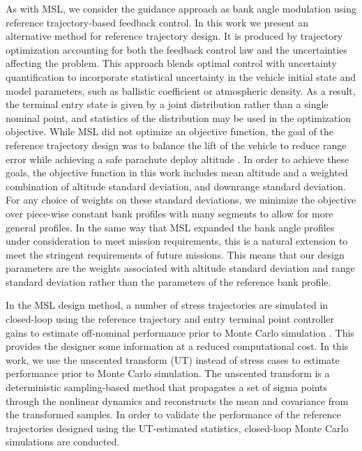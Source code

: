 \documentclass[journal ]{new-aiaa}
\begin{document}
As with MSL, we consider the guidance approach as bank angle modulation using reference trajectory-based feedback control. In this work we present an alternative method for reference trajectory design. It is produced by trajectory optimization accounting for both the feedback control law and the uncertainties affecting the problem. This approach blends optimal control with uncertainty quantification to incorporate statistical uncertainty in the vehicle initial state and model parameters, such as ballistic coefficient or atmospheric density. As a result, the terminal entry state is given by a joint distribution rather than a single nominal point, and statistics of the distribution may be used in the optimization objective. While MSL did not optimize an objective function, the goal of the reference trajectory design was to balance the lift of the vehicle to reduce range error while achieving a safe parachute deploy altitude \cite{MSL_EDL2}. In order to achieve these goals, the objective function in this work includes mean altitude and a weighted combination of altitude standard deviation, and downrange standard deviation. For any choice of weights on these standard deviations, we minimize the objective over piece-wise constant bank profiles with many segments to allow for more general profiles. In the same way that MSL expanded the bank angle profiles under consideration to meet mission requirements, this is a natural extension to meet the stringent requirements of future missions. This means that our design parameters are the weights associated with altitude standard deviation and range standard deviation rather than the parameters of the reference bank profile. 

In the MSL design method, a number of stress trajectories are simulated in closed-loop using the reference trajectory and entry terminal point controller gains to estimate off-nominal performance prior to Monte Carlo simulation \cite{MSL_EDL2}. This provides the designer some information at a reduced computational cost. In this work, we use the unscented transform (UT) \cite{UT1997} instead of stress cases to estimate performance prior to Monte Carlo simulation. The unscented transform is a deterministic sampling-based method that propagates a set of sigma points through the nonlinear dynamics and reconstructs the mean and covariance from the transformed samples. In order to validate the performance of the reference trajectories designed using the UT-estimated statistics, closed-loop Monte Carlo simulations are conducted.
\end{document}
